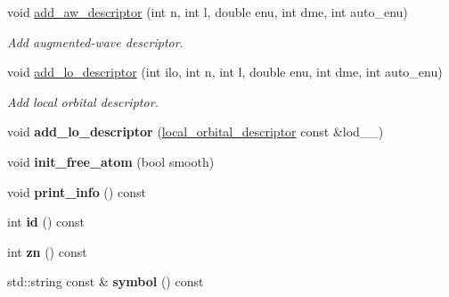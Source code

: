 \begin{DoxyCompactItemize}
\item 
void \hyperlink{classsirius_1_1_atom__type_ab9f51f4794036a38702cd9496b8415c0}{add\+\_\+aw\+\_\+descriptor} (int n, int l, double enu, int dme, int auto\+\_\+enu)
\begin{DoxyCompactList}\small\item\em Add augmented-\/wave descriptor. \end{DoxyCompactList}\item 
void \hyperlink{classsirius_1_1_atom__type_a148ce51efac7ff3782a0251ac9fd91c3}{add\+\_\+lo\+\_\+descriptor} (int ilo, int n, int l, double enu, int dme, int auto\+\_\+enu)
\begin{DoxyCompactList}\small\item\em Add local orbital descriptor. \end{DoxyCompactList}\item 
\hypertarget{classsirius_1_1_atom__type_a234b71e39a3bde6a8225dc4e15c52141}{}void {\bfseries add\+\_\+lo\+\_\+descriptor} (\hyperlink{structlocal__orbital__descriptor}{local\+\_\+orbital\+\_\+descriptor} const \&lod\+\_\+\+\_\+)\label{classsirius_1_1_atom__type_a234b71e39a3bde6a8225dc4e15c52141}

\item 
\hypertarget{classsirius_1_1_atom__type_a5b2149310e091897a63291ab9f218044}{}void {\bfseries init\+\_\+free\+\_\+atom} (bool smooth)\label{classsirius_1_1_atom__type_a5b2149310e091897a63291ab9f218044}

\item 
\hypertarget{classsirius_1_1_atom__type_ab51bc77843513ae246a7dd3f191bde9c}{}void {\bfseries print\+\_\+info} () const \label{classsirius_1_1_atom__type_ab51bc77843513ae246a7dd3f191bde9c}

\item 
\hypertarget{classsirius_1_1_atom__type_a68ed4ab87b9f2377fea59230b4d6fe98}{}int {\bfseries id} () const \label{classsirius_1_1_atom__type_a68ed4ab87b9f2377fea59230b4d6fe98}

\item 
\hypertarget{classsirius_1_1_atom__type_a2351cb4bc759d3ac665897260ba18b21}{}int {\bfseries zn} () const \label{classsirius_1_1_atom__type_a2351cb4bc759d3ac665897260ba18b21}

\item 
\hypertarget{classsirius_1_1_atom__type_a9aa01b34ffbe543e3e2a6c534ba06767}{}std\+::string const \& {\bfseries symbol} () const \label{classsirius_1_1_atom__type_a9aa01b34ffbe543e3e2a6c534ba06767}


\end{DoxyCompactItemize}
